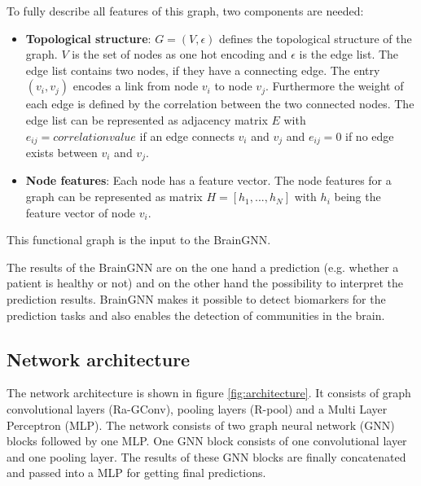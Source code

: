 To fully describe all features of this graph, two components are needed:
\begin{itemize}
	\item \textbf{Topological structure}: $G = (V, \epsilon)$ defines the topological structure of the graph. $V$ is the set of nodes as one hot encoding and $\epsilon$ is the edge list. The edge list contains two nodes, if they have a connecting edge. The entry $(v_i, v_j)$ encodes a link from node $v_i$ to node $v_j$. Furthermore the weight of each edge is defined by the correlation between the two connected nodes. The edge list can be represented as adjacency matrix $E$ with $e_{ij} = correlation value$ if an edge connects $v_i$ and $v_j$ and $e_{ij} = 0$ if no edge exists between $v_i$ and $v_j$.
	\item \textbf{Node features}: Each node has a feature vector. The node features for a graph can be represented as matrix $H = [h_1, ..., h_N]$ with $h_i$ being the feature vector of node $v_i$.
\end{itemize}

This functional graph is the input to the BrainGNN.


The results of the BrainGNN are on the one hand a prediction (e.g. whether a patient is healthy or not) and on the other hand the possibility to interpret the prediction results. BrainGNN makes it possible to detect biomarkers for the prediction tasks and also enables the detection of com\-mu\-nities in the brain.


\subsection{Network architecture}
\label{approach:B}

The network architecture is shown in figure \ref{fig:architecture}. It consists of graph con\-vo\-lu\-tio\-nal layers (Ra-GConv), pooling layers (R-pool) and a Multi Layer Perceptron (MLP). The network consists of two graph neural network (GNN) blocks followed by one MLP. One GNN block consists of one convolutional layer and one pooling layer. The results of these GNN blocks are finally concatenated and passed into a MLP for getting final predictions.

